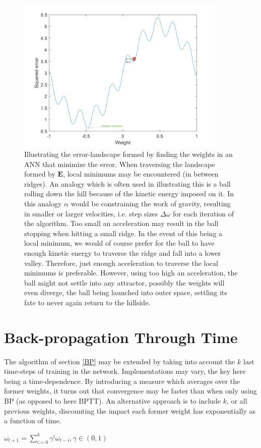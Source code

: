 \begin{figure}
\centering
\includegraphics[width=10cm]{fig/error_landscape_with_ball.png}
\caption{Illustrating the error-landscape formed by finding the weights in an ANN that minimize the error. When traversing the landscape formed by $\textbf{E}$, local minimums may be encountered (in between ridges). An analogy which is often used in illustrating this is a ball rolling down the hill because of the kinetic energy imposed on it. In this analogy $\alpha$ would be constraining the work of gravity, resulting in smaller or larger velocities, i.e. step sizes $\Delta \omega$ for each iteration of the algorithm.
Too small an acceleration may result in the ball stopping when hitting a small ridge. In the event of this being a local minimum, we would of course prefer for the ball to have enough kinetic energy to traverse the ridge and fall into a lower valley. Therefore, just enough acceleration to traverse the local minimums is preferable. However, using too high an acceleration, the ball might not settle into any attractor, possibly the weights will even diverge, the ball being launched into outer space, settling its fate to never again return to the hillside.}
\label{fig:steepest_descent}
\end{figure}

\section{Back-propagation Through Time}

The algorithm of section \ref{BP} may be extended by taking into account the $k$ last time-steps of training in the network. Implementations may vary, the key here being a time-dependence. By introducing a measure which averages over the former weights, it turns out that convergence may be faster than when only using BP (as opposed to here BPTT). An alternative approach is to include $k$, or all previous weights, discounting the impact each former weight has exponentially as a function of time.

\begin{center}
\begin{math}
    \omega_{t+1} = \sum_{i=0}^{k}\gamma^i \omega_{t-i},
    \gamma \in (0, 1)
\end{math}
\end{center}


\cleardoublepage